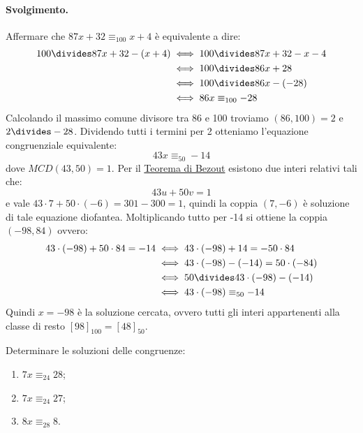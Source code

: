 \paragraph{Svolgimento.} Affermare che $87x+32 \equiv_{100} x+4$ è equivalente a dire:
\begin{align*}
	100 \divides 87x+32-(x+4) &\iff 100 \divides 87x+32-x-4 \\
	&\iff 100 \divides 86x+28\\
	&\iff 100 \divides 86x -(-28) \\
	&\iff 86x \equiv_{100} -28
\end{align*}
Calcolando il massimo comune divisore tra 86 e 100 troviamo $(86,100)=2$ e $2 \divides -28$. Dividendo tutti i termini per 2 otteniamo l'equazione congruenziale equivalente:
\[43x \equiv_{50} -14 \]
dove $MCD(43,50)=1$. Per il \hyperlink{thm:bezout}{Teorema di Bezout} esistono due interi relativi tali che:
\[43u+50v=1\]
e vale $43 \cdot 7 + 50 \cdot (-6)= 301-300=1$, quindi la coppia $(7,-6)$ è soluzione di tale equazione diofantea. Moltiplicando tutto per -14 si ottiene la coppia $(-98,84)$ ovvero:
\begin{align*}
	43 \cdot (-98) + 50 \cdot 84 = -14 &\iff 43 \cdot (-98) + 14  = - 50 \cdot 84 \\
	&\iff 43 \cdot (-98) - (-14) = 50 \cdot (-84) \\
	&\iff 50 \divides 43 \cdot (-98) - (-14)\\
	&\iff 43 \cdot (-98) \equiv_{50} -14
\end{align*}
Quindi $x=-98$ è la soluzione cercata, ovvero tutti gli interi appartenenti alla classe di resto $[98]_{100}=[48]_{50}$. \hfill \blacksquare

\begin{exsbox}
	Determinare le soluzioni delle congruenze:
	\begin{enumerate}
		\item $7x \equiv_{24} 28$;
		\item $7x \equiv_{24} 27$;
		\item $8x \equiv_{28} 8$.
	\end{enumerate}
	
\end{exsbox}
